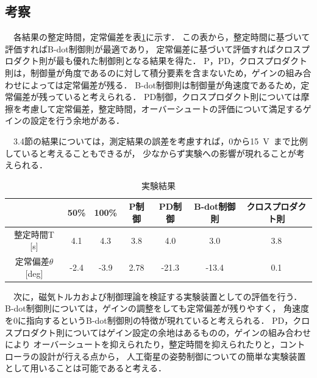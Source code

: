 \subsection{考察}
　各結果の整定時間，定常偏差を表\ref{table:result}に示す．
この表から，整定時間に基づいて評価すればB-dot制御則が最適であり，
定常偏差に基づいて評価すればクロスプロダクト則が最も優れた制御則となる結果を得た．
P，PD，クロスプロダクト則は，制御量が角度であるのに対して積分要素を含まないため，ゲインの組み合わせによっては定常偏差が残る．
B-dot制御則は制御量が角速度であるため，定常偏差が残っていると考えられる．
PD制御，クロスプロダクト則については摩擦を考慮して定常偏差，整定時間，オーバーシュートの評価について満足するゲインの設定を行う余地がある．

　3.4節の結果については，測定結果の誤差を考慮すれば，0から15~V~まで比例していると考えることもできるが，
少なからず実験への影響が現れることが考えられる．
\begin{table}[H]
	\centering
	\caption{実験結果}
	\label{table:result}
	\begin{tabular}{|c||c|c|c|c|c|c|}
		\hline
		 & 50\% & 100\% & P制御 & PD制御 & B-dot制御則 & クロスプロダクト則 \\ \hline
		整定時間T [s] & 4.1 & 4.3 & 3.8 & 4.0 & 3.0 & 3.8 \\ \hline
		定常偏差$\theta$ [deg] & -2.4 & -3.9 & 2.78 & -21.3 & -13.4 & 0.1 \\ \hline
	\end{tabular}
\end{table}

　次に，磁気トルカおよび制御理論を検証する実験装置としての評価を行う．
B-dot制御則については，ゲインの調整をしても定常偏差が残りやすく，
角速度を0に指向するというB-dot制御則の特徴が現れていると考えられる．
PD，クロスプロダクト則についてはゲイン設定の余地はあるものの，ゲインの組み合わせにより
オーバーシュートを抑えられたり，整定時間を抑えられたりと，コントローラの設計が行える点から，
人工衛星の姿勢制御についての簡単な実験装置として用いることは可能であると考える．

